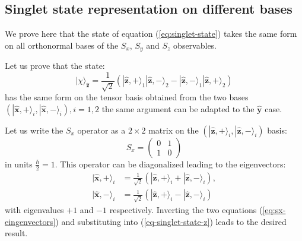 \chapter[Appendix]{}
\label{app:spin-predictions}

\section{Singlet state representation on different bases}
We prove here that the state of equation (\ref{eq:singlet-state}) takes the same form on all orthonormal bases of the $S_x$, $S_y$ and $S_z$ observables.

Let us prove that the state:
\begin{equation}
  |\chi\rangle_{\mathbf{\hat{z}}} = \frac{1}{\sqrt{2}} \left( |\mathbf{\hat{z}}, +\rangle_1 |\mathbf{\hat{z}}, -\rangle_2 - |\mathbf{\hat{z}}, -\rangle_1 |\mathbf{\hat{z}}, +\rangle_2 \right)
  \label{eq-singlet-state-z}
\end{equation}
has the same form on the tensor basis obtained from the two bases $\left( |\mathbf{\hat{x}}, +\rangle_i, |\mathbf{\hat{x}}, -\rangle_i \right), i = 1, 2$ the same argument can be adapted to the $\mathbf{\hat{y}}$ case.

Let us write the $S_x$ operator as a $2 \times 2$ matrix on the $\left( |\mathbf{\hat{z}}, +\rangle_i, |\mathbf{\hat{z}}, -\rangle_i \right)$ basis:
\begin{equation*}
  S_x =
  \begin{pmatrix}
    0 & 1\\
    1 & 0
  \end{pmatrix}
\end{equation*}
in units $\frac{\hbar}{2} = 1$. This operator can be diagonalized leading to the eigenvectors:
\begin{equation}
  \begin{split}
    |\mathbf{\hat{x}}, +\rangle_i &= \frac{1}{\sqrt{2}} \left( |\mathbf{\hat{z}}, +\rangle_i + |\mathbf{\hat{z}}, -\rangle_i \right),\\
    |\mathbf{\hat{x}}, -\rangle_i &= \frac{1}{\sqrt{2}} \left( |\mathbf{\hat{z}}, +\rangle_i - |\mathbf{\hat{z}}, -\rangle_i \right)
  \end{split}
  \label{eq:sx-eingenvectors}
\end{equation}
with eigenvalues $+ 1$ and $- 1$ respectively. Inverting the two equations (\ref{eq:sx-eingenvectors}) and substituting into (\ref{eq-singlet-state-z}) leads to the desired result.

